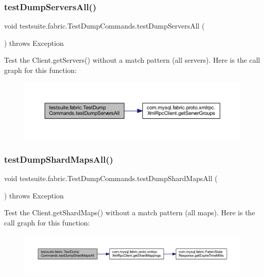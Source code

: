 \subsubsection{\texorpdfstring{test\+Dump\+Servers\+All()}{testDumpServersAll()}}
{\footnotesize\ttfamily void testsuite.\+fabric.\+Test\+Dump\+Commands.\+test\+Dump\+Servers\+All (\begin{DoxyParamCaption}{ }\end{DoxyParamCaption}) throws Exception}

Test the Client.\+get\+Servers() without a match pattern (all servers). Here is the call graph for this function\+:
\nopagebreak
\begin{figure}[H]
\begin{center}
\leavevmode
\includegraphics[width=350pt]{classtestsuite_1_1fabric_1_1_test_dump_commands_a75941414b59513c00c54c4fc8f09f13e_cgraph}
\end{center}
\end{figure}
\mbox{\label{classtestsuite_1_1fabric_1_1_test_dump_commands_a4badae860db743cca162a2b34ea98675}} 
\subsubsection{\texorpdfstring{test\+Dump\+Shard\+Maps\+All()}{testDumpShardMapsAll()}}
{\footnotesize\ttfamily void testsuite.\+fabric.\+Test\+Dump\+Commands.\+test\+Dump\+Shard\+Maps\+All (\begin{DoxyParamCaption}{ }\end{DoxyParamCaption}) throws Exception}

Test the Client.\+get\+Shard\+Maps() without a match pattern (all maps). Here is the call graph for this function\+:
\nopagebreak
\begin{figure}[H]
\begin{center}
\leavevmode
\includegraphics[width=350pt]{classtestsuite_1_1fabric_1_1_test_dump_commands_a4badae860db743cca162a2b34ea98675_cgraph}
\end{center}
\end{figure}


